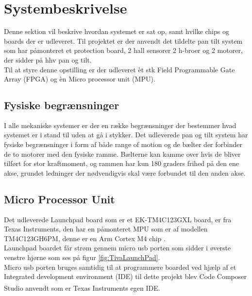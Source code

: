 \section{Systembeskrivelse}
Denne sektion vil beskrive hvordan systemet er sat op, samt hvilke chips og boards der er udleveret.
Til projektet er der anvendt det tildelte pan tilt system som har påmonteret et protection board, 2 hall sensorer 2 h-broer og 2 motorer, der sidder på hhv pan og tilt.\\
Til at styre denne opstilling er der udleveret èt stk Field Programmable Gate Array (FPGA) og èn Micro processor unit (MPU).
\\

\subsection{Fysiske begrænsninger}

I alle mekaniske systemer er der en række begrænsninger der bestemmer hvad systemet er i stand til uden at gå i stykker. Det udleverede pan og tilt system har fysiske begrænsninger i form af både range of motion og de bælter der forbinder de to motorer med den fysiske ramme. Bælterne kan kamme over hvis de bliver tilført for stor kraftmoment, og rammen har kun 180 graders frihed på den ene akse, grundet ledninger der nødvendigvis skal være forbundet til den anden akse.

\subsection{Micro Processor Unit}
Det udleverede Launchpad board som er et EK-TM4C123GXL board, er fra Texas Instruments, den har en påmonteret MPU som er af modellen TM4C123GH6PM, denne er en Arm Cortex M4 chip \cite{TM4C123GH6PMDatasheet}.\\
Launchpad boardet får strøm gennem micro usb porten som sidder i øverste venstre hjørne som ses på figur \ref{fig:TivaLaunchPad}.\\
Micro usb porten bruges samtidig til at programmere boarded ved hjælp af et Integrated development environment (IDE) til dette projekt blev Code Composer Studio \textsuperscript{\texttrademark} anvendt som er Texas Instruments egen IDE.

